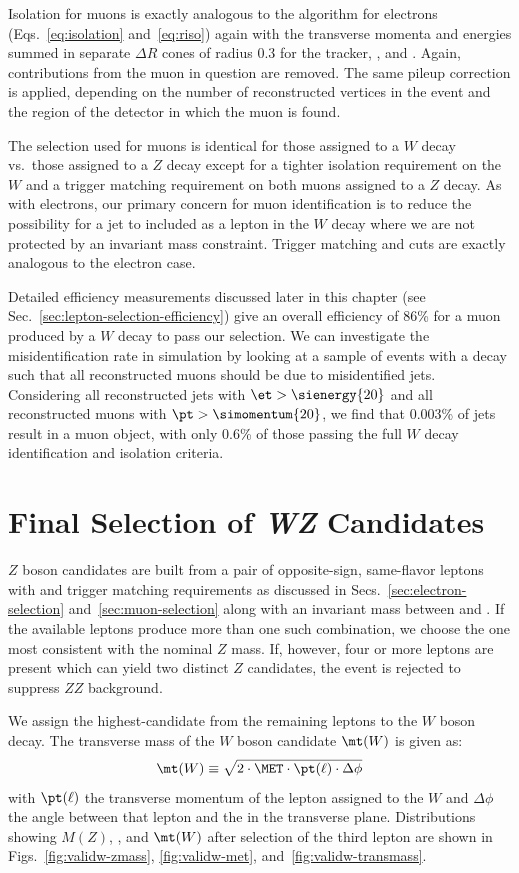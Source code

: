 Isolation for muons is exactly analogous to the algorithm for electrons (Eqs.~\ref{eq:isolation} and~\ref{eq:riso}) again with the transverse momenta and energies summed in separate $\Delta R$ cones of radius 0.3 for the tracker, \ecal, and \hcal.  Again, contributions from the muon in question are removed.  The same pileup correction is applied, depending on the number of reconstructed vertices in the event and the region of the detector in which the muon is found.

The selection used for muons is identical for those assigned to a $W$ decay vs.\ those assigned to a $Z$ decay except for a tighter isolation requirement on the $W$ and a trigger matching requirement on both muons assigned to a $Z$ decay.  As with electrons, our primary concern for muon identification is to reduce the possibility for a jet to included as a lepton in the $W$ decay where we are not protected by an invariant mass constraint.  Trigger matching and \pt cuts are exactly analogous to the electron case.

Detailed efficiency measurements discussed later in this chapter (see Sec.~\ref{sec:lepton-selection-efficiency}) give an overall efficiency of 86\% for a muon produced by a $W$ decay to pass our selection.  
We can investigate the misidentification rate in simulation by looking at a sample of \Zjets{} events with a \ztoee{} decay such that all reconstructed muons should be due to misidentified jets.  Considering all reconstructed jets with $\et > \sienergy{20}$ and all reconstructed muons with $\pt > \simomentum{20}$, we find that 0.003\% of jets result in a muon object, with only 0.6\% of those passing the full $W$ decay identification and isolation criteria.

\section{Final Selection of \textit{WZ} Candidates}
$Z$ boson candidates are built from a pair of opposite-sign, same-flavor leptons with \pt and trigger matching requirements as discussed in Secs.~\ref{sec:electron-selection} and~\ref{sec:muon-selection} along with an invariant mass between  and .  If the available leptons produce more than one such combination, we choose the one most consistent with the nominal $Z$ mass.  If, however, four or more leptons are present which can yield two distinct $Z$ candidates, the event is rejected to suppress $ZZ$ background.

We assign the highest-\pt candidate from the remaining leptons to the $W$ boson decay.  The transverse mass of the $W$ boson candidate $\mt(W)$ is given as:
\begin{equation}
  \label{eq:wtransmass}
  \mt(W) \equiv \sqrt{2 \cdot \MET \cdot \pt(\ell) \cdot \Delta \phi}
\end{equation}
with $\pt(\ell)$ the transverse momentum of the lepton assigned to the $W$ and $\Delta \phi$ the angle between that lepton and the \MET in the transverse plane.  Distributions showing $M(Z)$, \MET, and $\mt(W)$ after selection of the third lepton are shown in Figs.~\ref{fig:validw-zmass}, \ref{fig:validw-met}, and~\ref{fig:validw-transmass}.  

